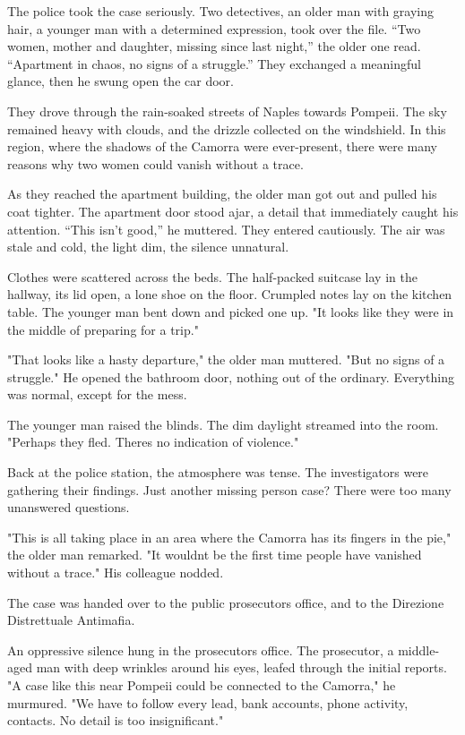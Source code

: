 \documentclass[
]{article}
\begin{document}
The police took the case seriously. Two detectives, an older man with graying hair, a younger man with a determined expression, took over the file. ``Two women, mother and daughter, missing since last night,'' the older one read. ``Apartment in chaos, no signs of a struggle.'' They exchanged a meaningful glance, then he swung open the car door.

They drove through the rain-soaked streets of Naples towards Pompeii. The sky remained heavy with clouds, and the drizzle collected on the windshield. In this region, where the shadows of the Camorra were ever-present, there were many reasons why two women could vanish without a trace.

As they reached the apartment building, the older man got out and pulled his coat tighter. The apartment door stood ajar, a detail that immediately caught his attention. ``This isn't good,'' he muttered. They entered cautiously. The air was stale and cold, the light dim, the silence unnatural.

Clothes were scattered across the beds. The half-packed suitcase lay in the hallway, its lid open, a lone shoe on the floor. Crumpled notes lay on the kitchen table. The younger man bent down and picked one up. "It looks like they were in the middle of preparing for a trip."

"That looks like a hasty departure," the older man muttered. "But no signs of a struggle." He opened the bathroom door, nothing out of the ordinary. Everything was normal, except for the mess.

The younger man raised the blinds. The dim daylight streamed into the room. "Perhaps they fled. There\textquotesingle s no indication of violence."

Back at the police station, the atmosphere was tense. The investigators were gathering their findings. Just another missing person case? There were too many unanswered questions.

"This is all taking place in an area where the Camorra has its fingers in the pie," the older man remarked. "It wouldn\textquotesingle t be the first time people have vanished without a trace." His colleague nodded.

The case was handed over to the public prosecutor\textquotesingle s office, and to the Direzione Distrettuale Antimafia.

An oppressive silence hung in the prosecutor\textquotesingle s office. The prosecutor, a middle-aged man with deep wrinkles around his eyes, leafed through the initial reports. "A case like this near Pompeii could be connected to the Camorra," he murmured. "We have to follow every lead, bank accounts, phone activity, contacts. No detail is too insignificant."
\end{document}

